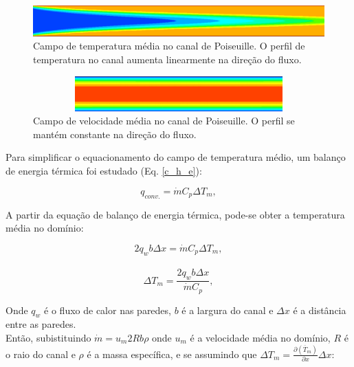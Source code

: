 \begin{figure}[h!]
	\centering
	\includegraphics[angle=0, scale=0.4]{cap_fundamentacao/temperatura.png}
	\caption{Campo de temperatura média no canal de Poiseuille. O perfil de temperatura no canal aumenta linearmente na direção do fluxo.}
	\label{figure.2}
\end{figure}
\begin{figure}[h!]
	\centering
	\includegraphics[angle=0, height=1.35cm , width=12.3cm]{cap_fundamentacao/velocidade.png}
	\caption{Campo de velocidade média no canal de Poiseuille. O perfil se mantém constante na direção do fluxo.}
	\label{figure.3}
\end{figure}

Para simplificar o equacionamento do campo de temperatura médio, um balanço de energia térmica foi estudado (Eq. \ref{c_h_e}):

\begin{equation}\label{c_h_e}
q_{conv.} = \dot{m} C_p \Delta T_m,
\end{equation}

A partir da equação de balanço de energia térmica, pode-se obter a temperatura média no domínio:

\begin{equation}
2q_w b \Delta x = \dot{m} C_p \Delta T_m,
\end{equation}\\

\begin{equation}
\Delta T_m = \frac{2q_w b \Delta x}{\dot{m} C_p},
\end{equation}

Onde $q_w$ é o fluxo de calor nas paredes, $b$ é a largura do canal e $\Delta x$ é a distância entre as paredes.\\
Então, subistituindo $ \dot{m} = u_m 2R b \rho $ onde $u_m$ é a velocidade média no domínio, $R$ é o raio do canal e $\rho$ é a massa específica, e se assumindo que $ \Delta T_m = \frac{\partial{\left(\overline{T}_m\right)}}{\partial{x}} \Delta x $: 

